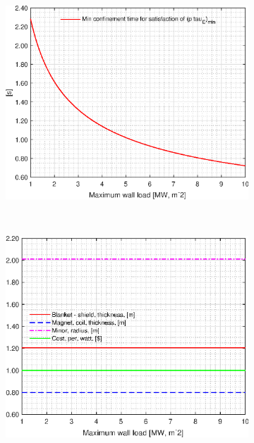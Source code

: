 \begin{figure}[H]
	\centering
	\begin{subfigure}[h!]{.45\textwidth}
		\includegraphics[width=\textwidth]{MatlabFigures/PW/f1.eps}
	\end{subfigure}
	~
	\begin{subfigure}[h!]{.45\textwidth}
		\includegraphics[width=\textwidth]{MatlabFigures/PW/f2.eps}
	\end{subfigure}


\end{figure}
